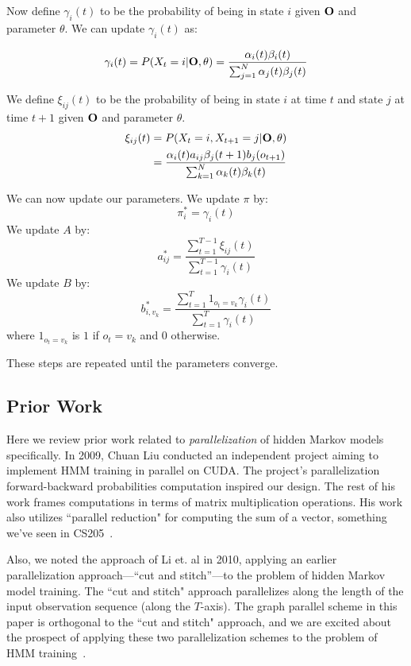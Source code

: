 Now define $\gamma_i(t)$ to be the probability of being in state $i$ given $\bold{O}$ and parameter $\theta$. We can update $\gamma_i(t)$ as:

\begin{equation} \label{gamma}
\gamma_i(t) = P(X_t = i | \bold{O}, \theta) = \frac{\alpha_i(t) \beta_i(t)}{\sum_{j=1}^N \alpha_j(t) \beta_j(t)}
\end{equation}

We define $\xi_{ij}(t)$ to be the probability of being in state $i$ at time $t$ and state $j$ at time $t+1$ given $\bold{O}$ and parameter $\theta$. 
\begin{equation}\label{xi}
\begin{aligned}
\xi_{ij}(t) &= P(X_t = i, X_{t+1} = j | \bold{O}, \theta)  \\
&=\frac{\alpha_i(t) a_{ij} \beta_j(t+1)b_{j}(o_{t+1})}{\sum_{k=1}^N \alpha_k(t) \beta_k(t)}
\end{aligned}
\end{equation}

We can now update our parameters. We update $\pi$ by:
\begin{equation}\label{pi}
\pi_i^* = \gamma_i(t)
\end{equation}
We update $A$ by:
\begin{equation}\label{a}
a^*_{ij} = \frac{\sum_{t=1}^{T-1}\xi_{ij}(t)}{\sum_{t=1}^{T-1}\gamma_i(t)}
\end{equation}
We update $B$ by:
\begin{equation}\label{b}
b^*_{i,v_k} = \frac{\sum_{t=1}^{T}1_{o_t = v_k} \gamma_i(t)}{\sum_{t=1}^T \gamma_i(t)}
\end{equation}
where $1_{o_t = v_k}$ is $1$ if $o_t = v_k$ and $0$ otherwise. 

These steps are repeated until the parameters converge. 

\subsection{Prior Work}

Here we review prior work related to \textit{parallelization} of hidden Markov
models specifically.  In 2009, Chuan Liu conducted an independent project aiming
to implement HMM training in parallel on CUDA.  The project's parallelization
forward-backward probabilities computation inspired our design.  The rest of his
work frames computations in terms of matrix multiplication operations.  His work
also utilizes ``parallel reduction" for computing the sum of a vector, something
we've seen in CS205~\cite{cuda-hmm}.

Also, we noted the approach of Li et. al in 2010, applying an earlier
parallelization approach---``cut and stitch''---to the problem of hidden Markov
model training.  The ``cut and stitch" approach parallelizes along the length of
the input observation sequence (along the $T$-axis).  The graph parallel scheme
in this paper is orthogonal to the ``cut and stitch" approach, and we are
excited about the prospect of applying these two parallelization schemes to the
problem of HMM training~\cite{cut-stitch}.
